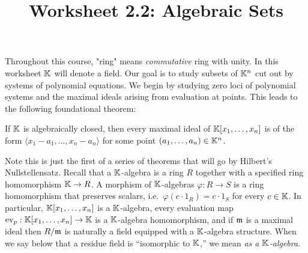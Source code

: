 \documentclass[12pt,reqno]{amsart}
\title{Worksheet 2.2: Algebraic Sets}
\begin{document}

\maketitle
\thispagestyle{firstpage}

Throughout this course, "ring" means  \textit{commutative} ring with unity. In this worksheet $\mathbb{K}$ will denote a field. Our goal is to study subsets of $\mathbb{K}^n$ cut out by systems of polynomial equations. We begin by studying zero loci of polynomial systems and the maximal ideals arising from evaluation at points. This leads to the following foundational theorem:

\begin{theorem} If $\mathbb{K}$ is algebraically closed, then every maximal ideal of $\mathbb{K}[x_1,\ldots,x_n]$ is of the form $\langle x_1-a_1,\ldots,x_n-a_n\rangle$ for some point $(a_1,\ldots,a_n) \in \mathbb{K}^n$.
\end{theorem}  
 
 Note this is just the first of a series of theorems that will go by Hilbert's Nullstellensatz. Recall that a $\mathbb{K}$-algebra is a ring $R$ together with a specified ring homomorphism $\mathbb{K} \to R$. A morphism of $\mathbb{K}$-algebras $\varphi:R\to S$ is a ring homomorphism that preserves scalars, i.e.\ $\varphi(c\cdot 1_R)=c\cdot 1_S$ for every $c\in \mathbb{K}$. In particular, $\mathbb{K}[x_1,\ldots,x_n]$ is a $\mathbb{K}$-algebra, every evaluation map $\operatorname{ev}_p:\mathbb{K}[x_1,\ldots,x_n]\to \mathbb{K}$ is a $\mathbb{K}$-algebra homomorphism, and if $\mathfrak{m}$ is a maximal ideal then $R/\mathfrak{m}$ is naturally a field equipped with a $\mathbb{K}$-algebra structure. When we say below that a residue field is ``isomorphic to $\mathbb{K}$,'' we mean \emph{as a $\mathbb{K}$-algebra}.

 
 \hrulefill 
\end{document}
